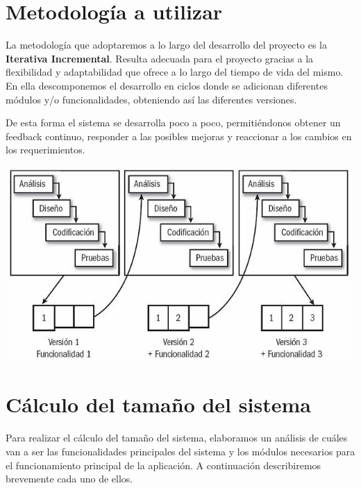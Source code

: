 \documentclass[a4paper,12pt]{article}
\begin{document}
    \section{Metodología a utilizar}
    \par La metodología que adoptaremos a lo largo del desarrollo del proyecto es la \textbf{Iterativa Incremental}. Resulta adecuada para el proyecto gracias a la flexibilidad y adaptabilidad que ofrece a lo largo del tiempo de vida del mismo. En ella descomponemos el desarrollo en ciclos donde se adicionan diferentes módulos y/o funcionalidades, obteniendo así las diferentes versiones.
    \par De esta forma el sistema se desarrolla poco a poco, permitiéndonos obtener un feedback continuo, responder a las posibles mejoras y reaccionar a los cambios en los requerimientos.
    \\
    \par \includegraphics[width=1\textwidth]{Imagenes/IterativoIncremental.png}
    

    \newpage

    \section{Cálculo del tamaño del sistema}
    \par Para realizar el cálculo del tamaño del sistema, elaboramos un análisis de cuáles van a ser las funcionalidades principales del sistema y los módulos necesarios para el funcionamiento principal de la aplicación. A continuación describiremos brevemente cada uno de ellos.
\end{document}

